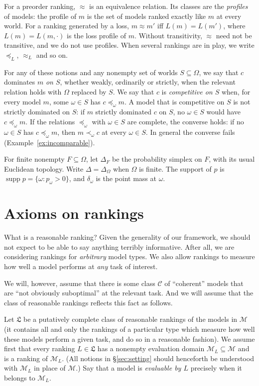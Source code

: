 \documentclass[11pt]{article}
\theoremstyle{definition}
\theoremstyle{remark}
\newcommand{\M}{\mathcal M}
\newcommand{\C}{\mathcal C}
\newcommand{\supp}{\operatorname{supp}}
\begin{document}
For a preorder ranking, $\approx$ is an equivalence relation. Its classes are the \emph{profiles} of models: the profile of $m$ is the set of models ranked exactly like $m$ at every world. For a ranking generated by a loss, $m\approx m'$ iff $L(m)=L(m')$, where $L(m)=L(m,\cdot)$ is the loss profile of $m$. Without transitivity, $\approx$ need not be transitive, and we do not use profiles. When several rankings are in play, we write $\preceq_L$, $\approx_L$ and so on.

For any of these notions and any nonempty set of worlds $S\subseteq\Omega$, we say that $c$ dominates $m$ \emph{on $S$}, whether weakly, ordinarily or strictly, when the relevant relation holds with $\Omega$ replaced by $S$. We say that $c$ is \emph{competitive on $S$} when, for every model $m$, some $\omega\in S$ has $c\preceq_\omega m$. A model that is competitive on $S$ is not strictly dominated on $S$: if $m$ strictly dominated $c$ on $S$, no $\omega\in S$ would have $c\preceq_\omega m$. If the relations $\preceq_\omega$ with $\omega\in S$ are complete, the converse holds: if no $\omega\in S$ has $c\preceq_\omega m$, then $m\prec_\omega c$ at every $\omega\in S$. In general the converse fails (Example~\ref{ex:incomparable}).

For finite nonempty $F\subseteq\Omega$, let $\Delta_F$ be the probability simplex on $F$, with its usual Euclidean topology. Write $\Delta=\Delta_\Omega$ when $\Omega$ is finite. The support of $p$ is $\supp p=\{\omega:p_\omega>0\}$, and $\delta_\omega$ is the point mass at $\omega$.

\section{Axioms on rankings}\label{sec:axioms}

What is a reasonable ranking? Given the generality of our framework, we should not expect to be able to say anything terribly informative. After all, we are considering rankings for \textit{arbitrary} model types. We also allow rankings to measure how well a model performs at \textit{any} task of interest.

We will, however, assume that there is some class $\C$ of ``coherent'' models that are ``not obviously suboptimal'' at the relevant task. And we will assume that the class of reasonable rankings reflects this fact as follows.

Let $\mathfrak L$ be a putatively complete class of reasonable rankings of the models in $\M$ (it contains all and only the rankings of a particular type which measure how well these models perform a given task, and do so in a reasonable fashion). We assume first that every ranking $L\in\mathfrak L$ has a nonempty evaluation domain $\M_L\subseteq\M$ and is a ranking of $\M_L$. (All notions in \S\ref{sec:setting} should henceforth be understood with $\M_L$ in place of $\M$.) Say that a model is \emph{evaluable by $L$} precisely when it belongs to $\M_L$.
\end{document}

